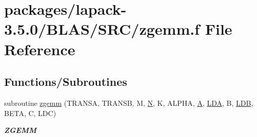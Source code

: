 \hypertarget{lapack-3_85_80_2BLAS_2SRC_2zgemm_8f}{}\section{packages/lapack-\/3.5.0/\+B\+L\+A\+S/\+S\+R\+C/zgemm.f File Reference}
\label{lapack-3_85_80_2BLAS_2SRC_2zgemm_8f}
\subsection*{Functions/\+Subroutines}
\begin{DoxyCompactItemize}
\item 
subroutine \hyperlink{group__complex16__blas__level3_ga4ef748ade85e685b8b2241a7c56dd21c}{zgemm} (T\+R\+A\+N\+S\+A, T\+R\+A\+N\+S\+B, M, \hyperlink{polmisc_8c_a0240ac851181b84ac374872dc5434ee4}{N}, K, A\+L\+P\+H\+A, \hyperlink{classA}{A}, \hyperlink{example__user_8c_ae946da542ce0db94dced19b2ecefd1aa}{L\+D\+A}, B, \hyperlink{example__user_8c_a50e90a7104df172b5a89a06c47fcca04}{L\+D\+B}, B\+E\+T\+A, C, L\+D\+C)
\begin{DoxyCompactList}\small\item\em {\bfseries Z\+G\+E\+M\+M} \end{DoxyCompactList}\end{DoxyCompactItemize}
